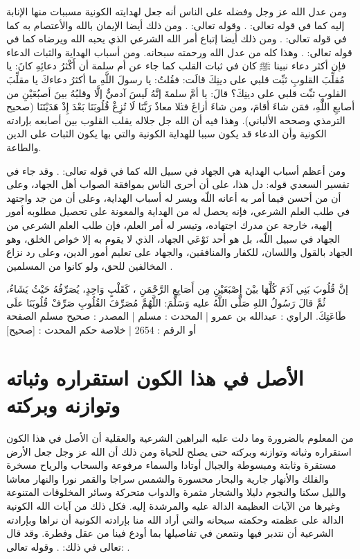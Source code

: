 ومن عدل الله عز وجل وفضله على الناس أنه جعل لهدايته الكونية مسببات منها الإنابة إليه كما في قوله تعالى:
\quranayah*[42][13][30]{\footnotesize \surahname*[42]}. وقوله تعالى:
\quranayah*[13][27]{\footnotesize \surahname*[13]}.
ومن ذلك أيضا الإيمان بالله والأعتصام به كما في قوله تعالى:
\quranayah*[4][175]{\footnotesize \surahname*[4]}. ومن ذلك أيضا إتباع أمر الله الشرعي الذي يحبه الله ويرضاه كما في قوله تعالى:
\quranayah*[5][16]{\footnotesize \surahname*[5]}.  وهذا كله من عدل الله ورحمته سبحانه. ومن أسباب الهداية والثبات الدعاء فإن أكثر دعاء نبينا ﷺ كان في ثبات القلب كما جاء عن أم سلمة أن أَكْثرُ دعائِهِ كانَ: يا مُقلِّبَ القلوبِ ثبِّت قلبي على دينِكَ قالَت: فقُلتُ: يا رسولَ اللَّهِ ما أكثرُ دعاءكَ يا مقلِّبَ القلوبِ ثبِّت قلبي على دينِكَ؟ قالَ: يا أمَّ سلمةَ إنَّهُ لَيسَ آدميٌّ إلَّا وقلبُهُ بينَ أصبُعَيْنِ من أصابعِ اللَّهِ، فمَن شاءَ أقامَ، ومن شاءَ أزاغَ \.فتلا معاذٌ رَبَّنَا لَا تُزِغْ قُلُوبَنَا بَعْدَ إِذْ هَدَيْتَنَا {\footnotesize (صحيح الترمذي وصححه الألباني)}. وهذا فيه أن الله جل جلاله يقلب القلوب بين أصابعه بإرادته الكونية وأن الدعاء قد يكون سببا للهداية الكونية والتي بها يكون الثبات على الدين والطاعة.  

ومن أعظم أسباب الهداية هي الجهاد في سبيل الله كما في قوله تعالى:  \quranayah*[29][69]{\footnotesize \surahname*[29]}. وقد جاء في تفسير السعدي قوله: دل هذا، على أن أحرى الناس بموافقة الصواب أهل الجهاد، وعلى أن من أحسن فيما أمر به أعانه اللّه ويسر له أسباب الهداية، وعلى أن من جد واجتهد في طلب العلم الشرعي، فإنه يحصل له من الهداية والمعونة على تحصيل مطلوبه أمور إلهية، خارجة عن مدرك اجتهاده، وتيسر له أمر العلم، فإن طلب العلم الشرعي من الجهاد في سبيل اللّه، بل هو أحد نَوْعَي الجهاد، الذي لا يقوم به إلا خواص الخلق، وهو الجهاد بالقول واللسان، للكفار والمنافقين، والجهاد على تعليم أمور الدين، وعلى رد نزاع المخالفين للحق، ولو كانوا من المسلمين \cite{tafsir_Saadi}.

إنَّ قُلُوبَ بَنِي آدَمَ كُلَّهَا بيْنَ إِصْبَعَيْنِ مِن أَصَابِعِ الرَّحْمَنِ ، كَقَلْبٍ وَاحِدٍ، يُصَرِّفُهُ حَيْثُ يَشَاءُ، ثُمَّ قالَ رَسُولُ اللهِ صَلَّى اللَّهُ عليه وَسَلَّمَ: اللَّهُمَّ مُصَرِّفَ القُلُوبِ صَرِّفْ قُلُوبَنَا علَى طَاعَتِكَ.
الراوي : عبدالله بن عمرو | المحدث : مسلم | المصدر : صحيح مسلم
الصفحة أو الرقم : 2654 | خلاصة حكم المحدث : [صحيح]

\section{الأصل في هذا الكون استقراره وثباته وتوازنه وبركته}

من المعلوم بالضرورة وما دلت عليه البراهين الشرعية والعقلية أن الأصل في هذا الكون استقراره وثباته وتوازنه وبركته حتى يصلح للحياة ومن ذلك أن الله عز وجل جعل الأرض مستقرة وثابتة ومبسوطة والجبال أوتادا والسماء مرفوعة والسحاب والرياح مسخرة والفلك والأنهار جارية والبحار محسورة والشمس سراجا والقمر نورا والنهار معاشا والليل سكنا والنجوم دليلا والشجار مثمرة والدواب متحركة وسائر المخلوقات المتنوعة وغيرها من الآيات العظيمة الدالة عليه والمرشدة إليه. فكل ذلك من آيات الله الكونية الدالة على عظمته وحكمته سبحانه والتي أراد الله منا بإرادته الكونية أن نراها وبإرادته الشرعية أن نتدبر فيها ونتمعن في تفاصيلها بما أودع فينا من عقل وفطرة. وقد قال تعالى في ذلك: 
\quranayah*[27][93]{\footnotesize \surahname*[27]}. وقوله تعالى:
\quranayah*[41][53]{\footnotesize \surahname*[41]}.

